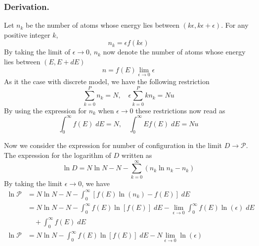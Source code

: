 \documentclass[../../../Main.tex]{subfiles}
\begin{document}
\subsubsection*{Derivation.} Let $n_k$ be the number of atoms whose energy lies between $(k\epsilon, k\epsilon+\epsilon)$. For any positive integer $k$, 
\begin{equation*}
    n_k=\epsilon f(k\epsilon)
\end{equation*}
By taking the limit of $\epsilon\rightarrow0$, $n_k$ now denote the number of atoms whose energy lies between $(E, E+dE)$
\begin{equation*}
   n=f(E)\lim_{\epsilon\rightarrow0}\epsilon
\end{equation*}
As it the case with discrete model, we have the following restriction
\begin{equation*}
    \sum_{k=0}^{P}n_k=N,\quad \epsilon\sum_{k=0}^{P} kn_k=Nu
\end{equation*}
By using the expression for $n_k$ when $\epsilon\rightarrow0$ these restrictions now read as
\begin{equation*}
    \int_{0}^{\infty}f(E)\;dE=N,\quad \int_{0}^{\infty}Ef(E)\;dE=Nu
\end{equation*}

Now we consider the expression for number of configuration in the limit $D\rightarrow\mathcal{P}$. The expression for the logarithm of $D$ written as
\begin{equation*}
    \ln D=N\ln N-N-\sum_{k=0}^{\infty}\left(n_k\ln n_k-n_k\right)
\end{equation*}
By taking the limit $\epsilon\rightarrow0$, we have
\begin{align*}
    \ln \mathcal{P} &= N\ln N-N-\int_{0}^{\infty}\left[f(E)\ln (n_k)-f(E)\right]\;dE\\
    & = N\ln N-N-\int_{0}^{\infty}f(E)\ln[ f(E)]\;dE - \lim_{\epsilon\rightarrow0}\int_{0}^{\infty}f(E)\ln(\epsilon)\;dE \\
    &\quad+  \int_{0}^{\infty}f(E)\;dE \\
    \ln \mathcal{P}&=N\ln N-\int_{0}^{\infty}f(E)\ln [f(E)]\;dE - N\lim_{\epsilon\rightarrow0}\ln(\epsilon) 
\end{align*}
\end{document}
